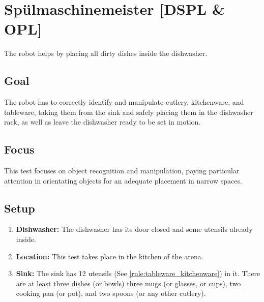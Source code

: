 \section{Sp{\"u}lmaschinemeister [DSPL \& OPL]}
The robot helps by placing all dirty dishes inside the dishwasher.

\subsection{Goal}
The robot has to correctly identify and manipulate cutlery, kitchenware, and tableware, taking them from the sink and safely placing them in the dishwasher rack, as well as leave the dishwasher ready to be set in motion.

\subsection{Focus}
This test focuses on object recognition and manipulation, paying particular attention in orientating objects for an adequate placement in narrow spaces.

\subsection{Setup}
\begin{enumerate}
	\item \textbf{Dishwasher:} The dishwasher has its door closed and some utensils already inside.
	\item \textbf{Location:} This test takes place in the kitchen of the arena.
	\item \textbf{Sink:} The sink has 12 utensils (See \ref{rule:tableware_kitchenware}) in it. There are at least three dishes (or bowls) three mugs (or glasses, or cups), two cooking pan (or pot), and two spoons (or any other cutlery).
\end{enumerate}


